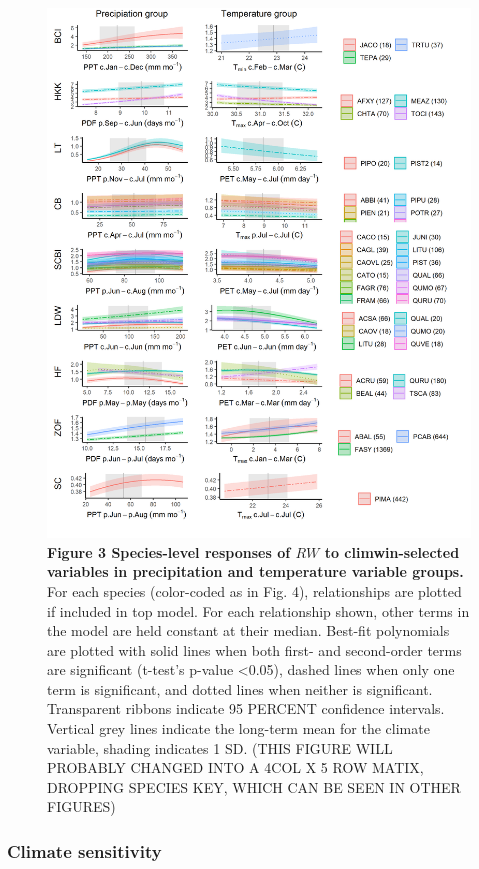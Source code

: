 \documentclass[
]{article}
\begin{document}
\begin{figure}
\centering
\includegraphics{tables_figures/pre_temp_groups.png}
\caption{\textbf{Figure 3 \textbar{} Species-level responses of \(RW\)
to climwin-selected variables in precipitation and temperature variable
groups.} For each species (color-coded as in Fig. 4), relationships are
plotted if included in top model. For each relationship shown, other
terms in the model are held constant at their median. Best-fit
polynomials are plotted with solid lines when both first- and
second-order terms are significant (t-test's p-value \textless0.05),
dashed lines when only one term is significant, and dotted lines when
neither is significant. Transparent ribbons indicate 95 PERCENT
confidence intervals. Vertical grey lines indicate the long-term mean
for the climate variable, shading indicates 1 SD. (THIS FIGURE WILL
PROBABLY CHANGED INTO A 4COL X 5 ROW MATIX, DROPPING SPECIES KEY, WHICH
CAN BE SEEN IN OTHER FIGURES)}
\end{figure}

\hypertarget{climate-sensitivity}{%
\subsubsection{Climate sensitivity}\label{climate-sensitivity}}
\end{document}
